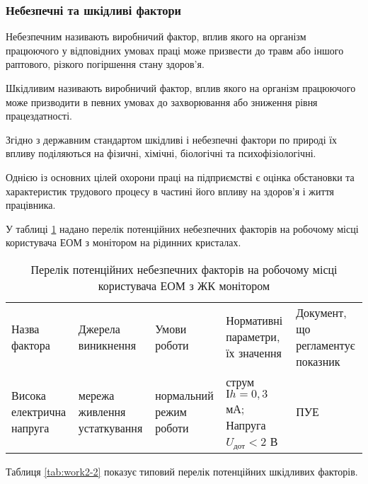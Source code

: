\subsubsection{Небезпечні та шкідливі фактори}

Небезпечним називають виробничий фактор, вплив якого на організм працюючого у відповідних умовах праці може призвести до травм або іншого раптового, різкого погіршення стану здоров’я.

Шкідливим називають виробничий фактор, вплив якого на організм працюючого може призводити в певних умовах до захворювання або зниження рівня працездатності.

Згідно з державним стандартом шкідливі і небезпечні фактори по природі їх впливу поділяються на фізичні, хімічні, біологічні та психофізіологічні.

Однією із основних цілей охорони праці на підприємстві є оцінка обстановки та характеристик трудового процесу в частині його впливу на здоров’я і життя працівника.

У таблиці \ref{tab:work2-1} надано перелік потенційних небезпечних факторів на робочому місці користувача ЕОМ з монітором на рідинних кристалах.

\begin{table}[hbt]
	\captionstyle{ \raggedright}
	\caption{Перелік потенційних небезпечних факторів на робочому місці користувача ЕОМ з ЖК монітором}\label{tab:work2-1}
	\begin{tabular}{|m{}|m{}|m{}|m{}|m{}|}
		\hline
		Назва фактора& Джерела виникнення& Умови роботи& Нормативні параметри, їх значення & Документ, що регламентує показник \\
		\hlinewd{2pt}
		Висока електрична напруга & мережа живлення устаткування & нормальний режим роботи & струм $Іh = 0,3$ мА; Напруга $U_\text{дот} < 2$ В & ПУЕ \\ [8em]
		\hline
	\end{tabular}
\end{table}

Таблиця \ref{tab:work2-2} показує типовий перелік потенційних шкідливих факторів.

\newpage

\vspace{-1.5em}


